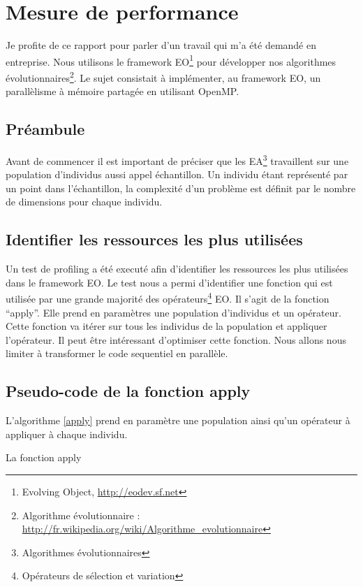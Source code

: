 \section{Mesure de performance}

Je profite de ce rapport pour parler d'un travail qui m'a été demandé en entreprise. Nous utilisons le framework EO\footnote{Evolving Object, \url{http://eodev.sf.net}} pour développer nos algorithmes évolutionnaires\footnote{Algorithme évolutionnaire : \url{http://fr.wikipedia.org/wiki/Algorithme_evolutionnaire}}. Le sujet consistait à implémenter, au framework EO, un parallèlisme à mémoire partagée en utilisant OpenMP.

\subsection{Préambule}

Avant de commencer il est important de préciser que les EA\footnote{Algorithmes évolutionnaires} travaillent sur une population d'individus aussi appel échantillon. Un individu étant représenté par un point dans l'échantillon, la complexité d'un problème est définit par le nombre de dimensions pour chaque individu.

\subsection{Identifier les ressources les plus utilisées}

Un test de profiling a été executé afin d'identifier les ressources les plus utilisées dans le framework EO. Le test nous a permi d'identifier une fonction qui est utilisée par une grande majorité des opérateurs\footnote{Opérateurs de sélection et variation} EO. Il s'agit de la fonction ``apply''. Elle prend en paramètres une population d'individus et un opérateur. Cette fonction va itérer sur tous les individus de la population et appliquer l'opérateur. Il peut être intéressant d'optimiser cette fonction. Nous allons nous limiter à transformer le code sequentiel en parallèle.

\subsection{Pseudo-code de la fonction apply}

L'algorithme \ref{apply} prend en paramètre une population ainsi qu'un opérateur à appliquer à chaque individu.

\incmargin{1em}
\begin{algorithm}[here]
  \dontprintsemicolon
  \label{apply}
  \caption{La fonction apply}
\end{algorithm}

